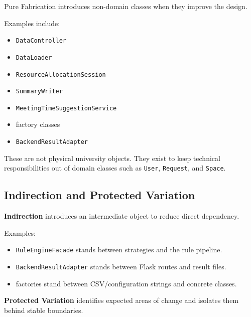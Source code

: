 \documentclass[12pt,a4paper]{article}
\begin{document}
Pure Fabrication introduces non-domain classes when they improve the design.

Examples include:

\begin{itemize}
    \item \texttt{DataController}
    \item \texttt{DataLoader}
    \item \texttt{ResourceAllocationSession}
    \item \texttt{SummaryWriter}
    \item \texttt{MeetingTimeSuggestionService}
    \item factory classes
    \item \texttt{BackendResultAdapter}
\end{itemize}

These are not physical university objects. They exist to keep technical
responsibilities out of domain classes such as \texttt{User},
\texttt{Request}, and \texttt{Space}.

\subsection{Indirection and Protected Variation}

\textbf{Indirection} introduces an intermediate object to reduce direct
dependency.

Examples:

\begin{itemize}
    \item \texttt{RuleEngineFacade} stands between strategies and the rule pipeline.
    \item \texttt{BackendResultAdapter} stands between Flask routes and result files.
    \item factories stand between CSV/configuration strings and concrete classes.
\end{itemize}

\textbf{Protected Variation} identifies expected areas of change and isolates
them behind stable boundaries.
\end{document}
